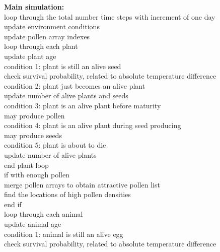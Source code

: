 \documentclass[3p,,preprint,12pt]{elsarticle}
\begin{document}
\noindent \textbf{Main simulation:}\\
    \indent loop through the total number time steps with increment of one day \\
    \indent \indent update environment conditions \\
    \indent \indent update pollen array indexes \\
    \indent \indent loop through each plant \\
    \indent \indent \indent update plant age \\
    \indent \indent \indent condition 1: plant is still an alive seed \\
    \indent \indent \indent \indent check survival probability, related to absolute temperature difference\\
    \indent \indent \indent condition 2: plant just becomes an alive plant \\
    \indent \indent \indent \indent update number of alive plants and seeds \\
    \indent \indent \indent condition 3: plant is an alive plant before maturity \\
    \indent \indent \indent \indent may produce pollen \\
    \indent \indent \indent condition 4: plant is an alive plant during seed producing \\
    \indent \indent \indent \indent may produce seeds \\
    \indent \indent \indent condition 5: plant is about to die \\
    \indent \indent \indent \indent update number of alive plants \\
    \indent \indent end plant loop \\
    \indent \indent if with enough pollen \\
    \indent \indent \indent merge pollen arrays to obtain attractive pollen list \\
    \indent \indent \indent find the locations of high pollen densities \\
    \indent \indent end if\\
    \indent \indent loop through each animal \\
    \indent \indent \indent update animal age \\
    \indent \indent \indent condition 1: animal is still an alive egg \\
    \indent \indent \indent \indent check survival probability, related to absolute temperature difference \\
\end{document}

